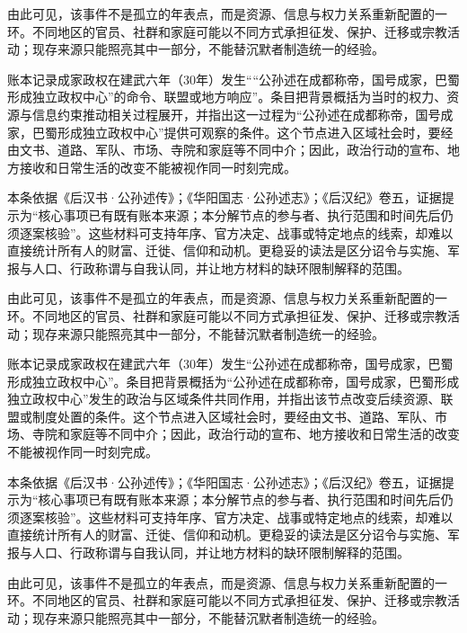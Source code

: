 由此可见，该事件不是孤立的年表点，而是资源、信息与权力关系重新配置的一环。不同地区的官员、社群和家庭可能以不同方式承担征发、保护、迁移或宗教活动；现存来源只能照亮其中一部分，不能替沉默者制造统一的经验。

账本记录成家政权在建武六年（30年）发生““公孙述在成都称帝，国号成家，巴蜀形成独立政权中心”的命令、联盟或地方响应”。条目把背景概括为当时的权力、资源与信息约束推动相关过程展开，并指出这一过程为“公孙述在成都称帝，国号成家，巴蜀形成独立政权中心”提供可观察的条件。这个节点进入区域社会时，要经由文书、道路、军队、市场、寺院和家庭等不同中介；因此，政治行动的宣布、地方接收和日常生活的改变不能被视作同一时刻完成。

本条依据《后汉书·公孙述传》；《华阳国志·公孙述志》；《后汉纪》卷五，证据提示为“核心事项已有既有账本来源；本分解节点的参与者、执行范围和时间先后仍须逐案核验”。这些材料可支持年序、官方决定、战事或特定地点的线索，却难以直接统计所有人的财富、迁徙、信仰和动机。更稳妥的读法是区分诏令与实施、军报与人口、行政称谓与自我认同，并让地方材料的缺环限制解释的范围。

由此可见，该事件不是孤立的年表点，而是资源、信息与权力关系重新配置的一环。不同地区的官员、社群和家庭可能以不同方式承担征发、保护、迁移或宗教活动；现存来源只能照亮其中一部分，不能替沉默者制造统一的经验。

账本记录成家政权在建武六年（30年）发生“公孙述在成都称帝，国号成家，巴蜀形成独立政权中心”。条目把背景概括为“公孙述在成都称帝，国号成家，巴蜀形成独立政权中心”发生的政治与区域条件共同作用，并指出该节点改变后续资源、联盟或制度处置的条件。这个节点进入区域社会时，要经由文书、道路、军队、市场、寺院和家庭等不同中介；因此，政治行动的宣布、地方接收和日常生活的改变不能被视作同一时刻完成。

本条依据《后汉书·公孙述传》；《华阳国志·公孙述志》；《后汉纪》卷五，证据提示为“核心事项已有既有账本来源；本分解节点的参与者、执行范围和时间先后仍须逐案核验”。这些材料可支持年序、官方决定、战事或特定地点的线索，却难以直接统计所有人的财富、迁徙、信仰和动机。更稳妥的读法是区分诏令与实施、军报与人口、行政称谓与自我认同，并让地方材料的缺环限制解释的范围。

由此可见，该事件不是孤立的年表点，而是资源、信息与权力关系重新配置的一环。不同地区的官员、社群和家庭可能以不同方式承担征发、保护、迁移或宗教活动；现存来源只能照亮其中一部分，不能替沉默者制造统一的经验。

